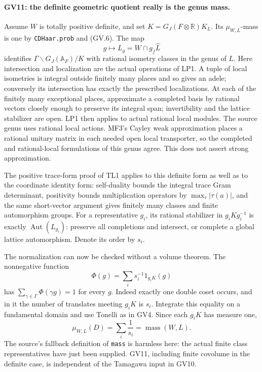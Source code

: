 \paragraph{GV11: the definite geometric quotient really is the genus mass.}
Assume $W$ is totally positive definite, and set
$K=G_J(F\otimes\mathbb R)K_L$. Its $\mu_{W,L}$-mass is one by
\texttt{CDHaar.prob} and (GV.6). The map
\[
 g\longmapsto L_g=W\cap g_f\widehat L
 \tag{GV.22}
\]
identifies $\Gamma\backslash G_J(\mathbb A_F)/K$ with rational
isometry classes in the genus of $L$. Here intersection and localization
are the actual operations of LP1. A tuple of local isometries is
integral outside finitely many places and so gives an adele;
conversely its intersection has exactly the prescribed localizations. At each of the finitely many exceptional
places, approximate a completed basis by rational vectors closely
enough to preserve its integral span; invertibility and the lattice
stabilizer are open. LP1 then applies to actual rational local modules.
The source genus uses rational local actions. MF3's Cayley weak
approximation places a rational unitary matrix in each needed open
local transporter, so the completed and rational-local formulations
of this genus agree. This does not assert strong approximation.

The positive trace-form proof of TL1 applies to this definite form as
well as to the coordinate identity form: self-duality bounds the
integral trace Gram determinant, positivity bounds multiplication
operators by $\max_\tau|\tau(a)|$, and the same short-vector argument
gives finitely many classes and finite automorphism groups. For a
representative $g_i$, its rational stabilizer in $g_iKg_i^{-1}$ is
exactly $\operatorname{Aut}(L_{g_i})$: preserve all completions and
intersect, or complete a global lattice automorphism. Denote its
order by $s_i$.

The normalization can now be checked without a volume theorem.
The nonnegative function
\[
                  \Phi(g)=\sum_i s_i^{-1}1_{g_iK}(g)
 \tag{GV.23}
\]
has $\sum_{\gamma\in\Gamma}\Phi(\gamma g)=1$ for every $g$.
Indeed exactly one double coset occurs, and in it the number of
translates meeting $g_iK$ is $s_i$. Integrate this equality on a
fundamental domain and use Tonelli as in GV4. Since each $g_iK$ has
measure one,
\[
 \boxed{\ \mu_{W,L}(D)=\sum_i\frac1{s_i}
                    =\operatorname{mass}(W,L).\ }   \tag{GV.24}
\]
The source's fallback definition of \texttt{mass} is harmless here:
the actual finite class representatives have just been supplied.
GV11, including finite covolume in the definite case, is independent
of the Tamagawa input in GV10.

